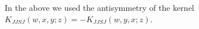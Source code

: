 \documentclass[11pt,a4paper]{article}
\begin{document}
In the above we used the antisymmetry of the kernel $K_{JJSJ}(w,x,y;z)=-K_{JJSJ}(w,y,x;z)$.
\end{document}
